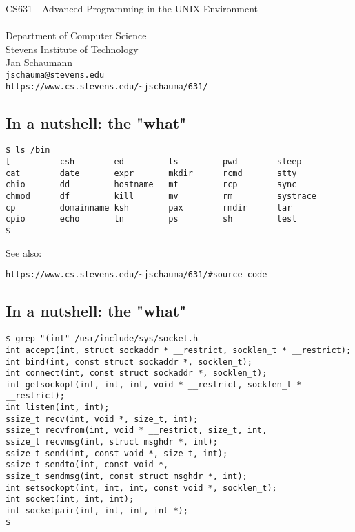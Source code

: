 \documentclass[xga]{xdvislides}
\begin{document}
\setfontphv

\lhead{\slidetitle}
\cfoot{\relax}
\rfoot{\Gray{\today}}

\vspace*{\fill}
\begin{center}
	\Hugesize
		CS631 - Advanced Programming in the UNIX Environment\\ [1em]
	\hspace*{5mm}\blueline\\ [1em]
	\Normalsize
		Department of Computer Science\\
		Stevens Institute of Technology\\
		Jan Schaumann\\
		\verb+jschauma@stevens.edu+\\
		\verb+https://www.cs.stevens.edu/~jschauma/631/+
\end{center}
\vspace*{\fill}

\subsection{In a nutshell: the "what"}
\begin{verbatim}
$ ls /bin
[          csh        ed         ls         pwd        sleep
cat        date       expr       mkdir      rcmd       stty
chio       dd         hostname   mt         rcp        sync
chmod      df         kill       mv         rm         systrace
cp         domainname ksh        pax        rmdir      tar
cpio       echo       ln         ps         sh         test
$
\end{verbatim}

See also:
\begin{verbatim}
https://www.cs.stevens.edu/~jschauma/631/#source-code
\end{verbatim}


\subsection{In a nutshell: the "what"}
\begin{verbatim}
$ grep "(int" /usr/include/sys/socket.h
int	accept(int, struct sockaddr * __restrict, socklen_t * __restrict);
int	bind(int, const struct sockaddr *, socklen_t);
int	connect(int, const struct sockaddr *, socklen_t);
int	getsockopt(int, int, int, void * __restrict, socklen_t * __restrict);
int	listen(int, int);
ssize_t	recv(int, void *, size_t, int);
ssize_t	recvfrom(int, void * __restrict, size_t, int,
ssize_t	recvmsg(int, struct msghdr *, int);
ssize_t	send(int, const void *, size_t, int);
ssize_t	sendto(int, const void *,
ssize_t	sendmsg(int, const struct msghdr *, int);
int	setsockopt(int, int, int, const void *, socklen_t);
int	socket(int, int, int);
int	socketpair(int, int, int, int *);
$
\end{verbatim}
\end{document}
